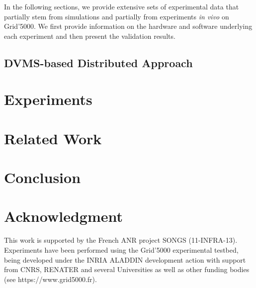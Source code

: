 \documentclass[conference]{IEEEtran}
\begin{document}
In the following sections, we provide extensive sets of experimental data
  that partially stem from simulations and partially from experiments
  \emph{in vivo} on Grid'5000. We first provide
  information on the hardware and software underlying each experiment
  and then present the validation results.




\subsection{DVMS-based Distributed Approach}
\label{subsec:dvms}

\section{Experiments}
\label{sec:experiments}
\section{Related Work}
\label{sec:related}
\section{Conclusion}
\label{sec:conclusion}





\section*{Acknowledgment}
This work is supported by the French ANR project SONGS (11-INFRA-13).
Experiments have been performed using the Grid'5000
experimental testbed, being developed under the INRIA ALADDIN development
 action with support from CNRS, RENATER and several Universities as well as
 other funding bodies (see https://www.grid5000.fr).



\end{document}
